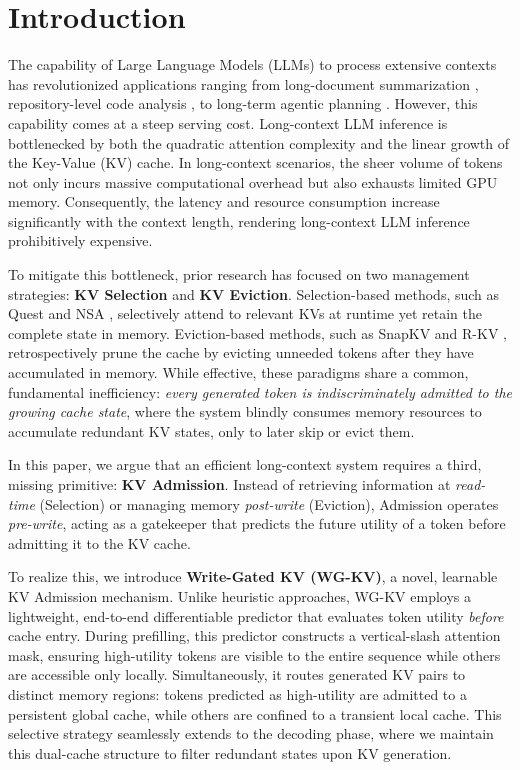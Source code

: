 \section{Introduction}


The capability of Large Language Models (LLMs) to process extensive contexts has revolutionized applications ranging from long-document summarization \cite{longbenchv2}, repository-level code analysis \cite{coderepoqa}, to long-term agentic planning \cite{planandact}. However, this capability comes at a steep serving cost. Long-context LLM inference is bottlenecked by both the quadratic attention complexity and the linear growth of the Key-Value (KV) cache. In long-context scenarios, the sheer volume of tokens not only incurs massive computational overhead but also exhausts limited GPU memory. Consequently, the latency and resource consumption increase significantly with the context length, rendering long-context LLM inference prohibitively expensive.

To mitigate this bottleneck, prior research has focused on two management strategies: \textbf{KV Selection} and \textbf{KV Eviction}. Selection-based methods, such as Quest \cite{quest} and NSA \cite{nsa}, selectively attend to relevant KVs at runtime yet retain the complete state in memory. Eviction-based methods, such as SnapKV \cite{snapkv} and R-KV \cite{rkv}, retrospectively prune the cache by evicting unneeded tokens after they have accumulated in memory. While effective, these paradigms share a common, fundamental inefficiency: \textit{every generated token is indiscriminately admitted to the growing cache state}, where the system blindly consumes memory resources to accumulate redundant KV states, only to later skip or evict them.

In this paper, we argue that an efficient long-context system requires a third, missing primitive: \textbf{KV Admission}. Instead of retrieving information at \textit{read-time} (Selection) or managing memory \textit{post-write} (Eviction), Admission operates \textit{pre-write}, acting as a gatekeeper that predicts the future utility of a token before admitting it to the KV cache.

To realize this, we introduce \textbf{Write-Gated KV (WG-KV)}, a novel, learnable KV Admission mechanism. Unlike heuristic approaches, WG-KV employs a lightweight, end-to-end differentiable predictor that evaluates token utility \textit{before} cache entry. During prefilling, this predictor constructs a vertical-slash attention mask, ensuring high-utility tokens are visible to the entire sequence while others are accessible only locally. Simultaneously, it routes generated KV pairs to distinct memory regions: tokens predicted as high-utility are admitted to a persistent global cache, while others are confined to a transient local cache. This selective strategy seamlessly extends to the decoding phase, where we maintain this dual-cache structure to filter redundant states upon KV generation.


